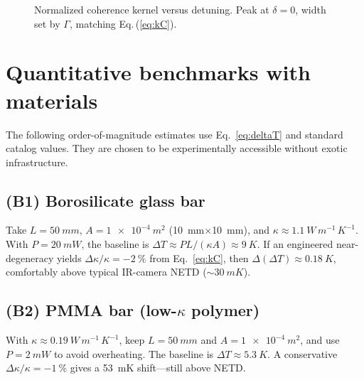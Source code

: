 \documentclass[aps,prb,preprint,amsmath,amssymb]{revtex4-2} %
\begin{document}
        \begin{figure}[h]
            \centering
            \caption{Normalized coherence kernel versus detuning. Peak at $\delta{=}0$, width set by $\Gamma$, matching Eq.\,(\ref{eq:kC}).}
            \label{fig:lorentzian_kernel}
        \end{figure}


    \section{Quantitative benchmarks with materials}
        The following order-of-magnitude estimates use Eq.~\eqref{eq:deltaT} and standard catalog values. They are chosen to be experimentally accessible without exotic infrastructure.

        \subsection*{(B1) Borosilicate glass bar}
            Take $L=\SI{50}{mm}$, $A=\SI{1e-4}{m^2}$ (\SI{10}{mm}$\times$\SI{10}{mm}), and $\kappa\approx\SI{1.1}{W\,m^{-1}\,K^{-1}}$. With $P=\SI{20}{mW}$, the baseline is $\Delta T \approx P L/(\kappa A) \approx \SI{9}{K}$. If an engineered near-degeneracy yields $\Delta\kappa/\kappa=\SI{-2}{\percent}$ from Eq.~\eqref{eq:kC}, then $\Delta(\Delta T)\approx\SI{+0.18}{K}$, comfortably above typical IR-camera NETD ($\sim\SI{30}{mK}$).

        \subsection*{(B2) PMMA bar (low-$\kappa$ polymer)}
            With $\kappa\approx\SI{0.19}{W\,m^{-1}\,K^{-1}}$, keep $L=\SI{50}{mm}$ and $A=\SI{1e-4}{m^2}$, and use $P=\SI{2}{mW}$ to avoid overheating. The baseline is $\Delta T\!\approx\!\SI{5.3}{K}$. A conservative $\Delta\kappa/\kappa=\SI{-1}{\percent}$ gives a \SI{53}{mK} shift—still above NETD.
\end{document}
